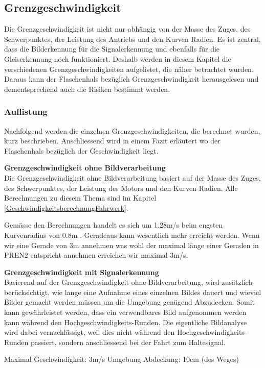 \documentclass[../../main.tex]{subfiles}
\begin{document}
\subsection{Grenzgeschwindigkeit}
Die Grenzgeschwindigkeit ist nicht nur abhängig von der Masse des Zuges, des Schwerpunktes, der Leistung des Antriebs und den Kurven Radien.
Es ist zentral, dass die Bilderkennung für die Signalerkennung und ebenfalls für die Gleiserkennung noch funktioniert.
Deshalb werden in diesem Kapitel die verschiedenen Grenzgeschwindigkeiten aufgelistet, die näher betrachtet wurden.
Daraus kann der Flaschenhals bezüglich Grenzgeschwindigkeit herausgelesen und dementsprechend auch die Risiken
bestimmt werden.

\subsubsection{Auflistung}
Nachfolgend werden die einzelnen Grenzgeschwindigkeiten, die berechnet wurden, kurz beschrieben. Anschliessend wird in
einem Fazit erläutert wo der Flaschenhals bezüglich der Geschwindigkeit liegt.

\textbf{Grenzgeschwindigkeit ohne Bildverarbeitung} \\
Die Grenzgeschwindigkeit ohne Bildverarbeitung basiert auf der Masse des Zuges, des Schwerpunktes, der Leistung des Motors und den Kurven Radien.
Alle Berechnungen zu diesem Thema sind im Kapitel \ref{GeschwindigkeitsberechnungFahrwerk}.

Gemässe den Berechnungen handelt es sich um 1.28m/s beim engsten Kurvenradius von 0.8m . Geradeaus kann wesentlich mehr
erreicht werden. Wenn wir eine Gerade von 3m annehmen was wohl der maximal länge einer Geraden in PREN2 entspricht
annehmen erreichen wir maximal 3m/s.

\textbf{Grenzgeschwindigkeit mit Signalerkennung} \\
Basierend auf der Grenzgeschwindigkeit ohne Bildverarbeitung, wird zusätzlich berücksichtigt, wie lange eine
Aufnahme eines einzelnen Bildes dauert und wieviel Bilder gemacht werden müssen um die Umgebung genügend Abzudecken.
Somit kann gewährleistet werden, dass ein verwendbares Bild aufgenommen werden kann während den Hochgeschwindigkeits-Runden. Die eigentliche Bildanalyse
wird dabei vernachlässigt, weil dies nicht während den Hochgeschwindigkeits-Runden passiert, sondern anschliessend bei
der Fahrt zum Haltesignal.

Maximal Geschwindigkeit: 3m/s
Umgebung Abdeckung: 10cm (des Weges)
\end{document}
